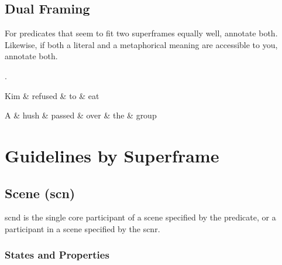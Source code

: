 \documentclass[a4paper]{article}
\begin{document}
\subsection{Dual Framing}

For predicates that seem to fit two superframes equally well, annotate both. Likewise, if both a literal and a metaphorical meaning are accessible to you, annotate both.

\ex.
\begin{dependency}
    \begin{deptext}
        Kim \& refused \& to \& eat \\
    \end{deptext}
\end{dependency}
\begin{dependency}
    \begin{deptext}
        A \& hush \& passed \& over \& the \& group \\
    \end{deptext}
\end{dependency}

\section{Guidelines by Superframe}


\subsection{Scene (\textsf{scn})}
\label{sec:scn}

\textsf{scnd} is the single core participant of a scene specified by the
predicate, or a participant in a scene specified by the \textsf{scnr}.

\subsubsection{States and Properties}
\end{document}
